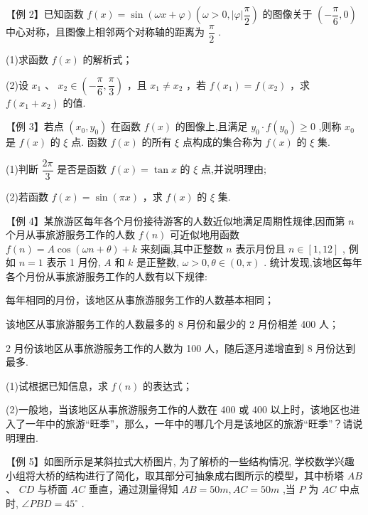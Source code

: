 【例 2】已知函数 $f\left( x\right)  = \sin \left( {{\omega x} + \varphi }\right) \left( {\omega  > 0,\left| \varphi \right| \dfrac{\pi }{2}}\right)$ 的图像关于 $\left( {-\dfrac{\pi }{6},0}\right)$ 中心对称，且图像上相邻两个对称轴的距离为 $\dfrac{\pi }{2}$ .

(1)求函数 $f\left( x\right)$ 的解析式；

(2)设 ${x}_{1}$ 、 ${x}_{2} \in  \left( {-\dfrac{\pi }{6},\dfrac{\pi }{3}}\right)$ ，且 ${x}_{1} \neq  {x}_{2}$ ，若 $f\left( {x}_{1}\right)  = f\left( {x}_{2}\right)$ ，求 $f\left( {{x}_{1} + {x}_{2}}\right)$ 的值.

【例 3】若点 $\left( {{x}_{0},{y}_{0}}\right)$ 在函数 $f\left( x\right)$ 的图像上,且满足 ${y}_{0} \cdot  f\left( {y}_{0}\right)  \geq  0$ ,则称 ${x}_{0}$ 是 $f\left( x\right)$ 的 $\xi$ 点. 函数 $f\left( x\right)$ 的所有 $\xi$ 点构成的集合称为 $f\left( x\right)$ 的 $\xi$ 集.

(1)判断 $\dfrac{2\pi }{3}$ 是否是函数 $f\left( x\right)  = \tan x$ 的 $\xi$ 点,并说明理由;

(2)若函数 $f\left( x\right)  = \sin \left( {\pi x}\right)$ ，求 $f\left( x\right)$ 的 $\xi$ 集.

【例 4】某旅游区每年各个月份接待游客的人数近似地满足周期性规律,因而第 $n$ 个月从事旅游服务工作的人数 $f\left( n\right)$ 可近似地用函数 $f\left( n\right)  = A\cos \left( {{\omega n} + \theta }\right)  + k$ 来刻画,其中正整数 $n$ 表示月份且 $n \in  \left\lbrack  {1,{12}}\right\rbrack$ , 例如 $n = 1$ 表示 1 月份, $A$ 和 $k$ 是正整数, $\omega  > 0,\theta  \in  \left( {0,\pi }\right)$ . 统计发现,该地区每年各个月份从事旅游服务工作的人数有以下规律:

  每年相同的月份，该地区从事旅游服务工作的人数基本相同；

  该地区从事旅游服务工作的人数最多的 8 月份和最少的 2 月份相差 400 人；

  2 月份该地区从事旅游服务工作的人数为 100 人，随后逐月递增直到 8 月份达到最多.

(1)试根据已知信息，求 $f\left( n\right)$ 的表达式；

(2)一般地，当该地区从事旅游服务工作的人数在 400 或 400 以上时，该地区也进入了一年中的旅游“旺季”，那么，一年中的哪几个月是该地区的旅游“旺季”？请说明理由.

【例 5】如图所示是某斜拉式大桥图片, 为了解桥的一些结构情况, 学校数学兴趣小组将大桥的结构进行了简化，取其部分可抽象成右图所示的模型，其中桥塔 ${AB}$ 、 ${CD}$ 与桥面 ${AC}$ 垂直，通过测量得知 ${AB} =  {50}{m},{AC} = {50}{m}$ ,当 $P$ 为 ${AC}$ 中点时, $\angle {PBD} = {45}^{ \circ  }$ .

